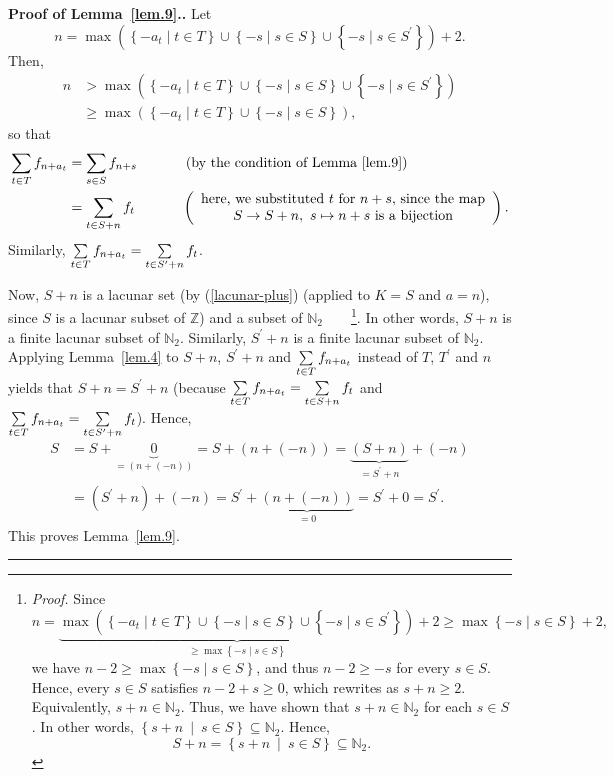 \documentclass[numbers=enddot,12pt,final,onecolumn,notitlepage]{scrartcl}%
\numberwithin{exer}{section}
\theoremstyle{definition}
\newenvironment{proof}[1][Proof]{\noindent\textbf{#1.} }{\ \rule{0.5em}{0.5em}}
\let\sumnonlimits\sum
\renewcommand{\sum}{\sumnonlimits\limits}
\begin{document}
\begin{proof}[Proof of Lemma~\ref{lem.9}.] Let%
\[
n=\max\left(  \left\{  -a_{t}\mid t\in T\right\}  \cup\left\{  -s\mid s\in
S\right\}  \cup\left\{  -s\mid s\in S^{\prime}\right\}  \right)  +2.
\]
Then,%
\begin{align*}
n  &  >\max\left(  \left\{  -a_{t}\mid t\in T\right\}  \cup\left\{  -s\mid
s\in S\right\}  \cup\left\{  -s\mid s\in S^{\prime}\right\}  \right) \\
&  \geq\max\left(  \left\{  -a_{t}\mid t\in T\right\}  \cup\left\{  -s\mid
s\in S\right\}  \right)  ,
\end{align*}
so that%
\begin{align*}
\sum\limits_{t\in T}f_{n+a_{t}}  &  =\sum\limits_{s\in S}f_{n+s}%
\ \ \ \ \ \ \ \ \ \ \left(  \text{by the condition of Lemma~\ref{lem.9}}\right) \\
&  =\sum\limits_{t\in S+n}f_{t}\ \ \ \ \ \ \ \ \ \ \left(
\begin{array}
[c]{c}%
\text{here, we substituted }t\text{ for }n+s\text{, since the map}\\
S\rightarrow S+n,\ s\mapsto n+s\text{ is a bijection}%
\end{array}
\right)  .
\end{align*}
Similarly, $\sum\limits_{t\in T}f_{n+a_{t}}=\sum\limits_{t\in S^{\prime}%
+n}f_{t}$.

Now, $S+n$ is a lacunar set (by (\ref{lacunar-plus}) (applied to $K=S$ and
$a=n$), since $S$ is a lacunar subset of $\mathbb{Z}$) and a subset of
$\mathbb{N}_{2}$\ \ \ \ \footnote{\textit{Proof.} Since%
\[
n=\underbrace{\max\left(  \left\{  -a_{t}\mid t\in T\right\}  \cup\left\{
-s\mid s\in S\right\}  \cup\left\{  -s\mid s\in S^{\prime}\right\}  \right)
}_{\geq\max\left\{  -s\mid s\in S\right\}  }+2\geq\max\left\{  -s\mid s\in
S\right\}  +2,
\]
we have $n-2\geq\max\left\{  -s\mid s\in S\right\}  $, and thus $n-2\geq-s$
for every $s\in S$. Hence, every $s\in S$ satisfies $n-2+s\geq0$, which
rewrites as $s+n\geq2$. Equivalently, $s+n\in\mathbb{N}_{2}$. Thus, we have
shown that $s+n\in\mathbb{N}_{2}$ for each $s\in S$. In other words, $\left\{
s+n\ \mid\ s\in S\right\}  \subseteq\mathbb{N}_{2}$. Hence,
\[
S+n=\left\{  s+n\ \mid\ s\in S\right\}  \subseteq\mathbb{N}_{2}.
\]
}. In other words, $S+n$ is a finite lacunar subset of $\mathbb{N}_{2}$.
Similarly, $S^{\prime}+n$ is a finite lacunar subset of $\mathbb{N}_{2}$.
Applying Lemma~\ref{lem.4} to $S+n$, $S^{\prime}+n$ and $\sum\limits_{t\in T}f_{n+a_{t}%
}$ instead of $T$, $T^{\prime}$ and $n$ yields that $S+n=S^{\prime}+n$
(because $\sum\limits_{t\in T}f_{n+a_{t}}=\sum\limits_{t\in S+n}f_{t}$ and
$\sum\limits_{t\in T}f_{n+a_{t}}=\sum\limits_{t\in S^{\prime}+n}f_{t}$).
Hence,%
\begin{align*}
S  &  =S+\underbrace{0}_{=\left(  n+\left(  -n\right)  \right)  }=S+\left(
n+\left(  -n\right)  \right)  =\underbrace{\left(  S+n\right)  }_{=S^{\prime
}+n}+\left(  -n\right) \\
&  =\left(  S^{\prime}+n\right)  +\left(  -n\right)  =S^{\prime}%
+\underbrace{\left(  n+\left(  -n\right)  \right)  }_{=0}=S^{\prime
}+0=S^{\prime}.
\end{align*}
This proves Lemma~\ref{lem.9}.
\end{proof}
\end{document}

